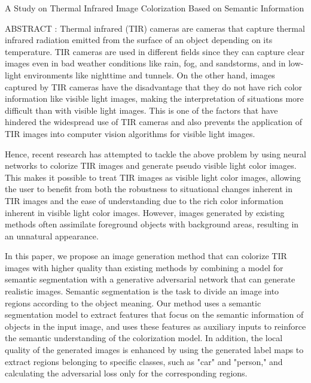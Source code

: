 \thispagestyle{empty}
\begin{center}
    A Study on Thermal Infrared Image Colorization Based on Semantic Information
\end{center}

\thispagestyle{empty}
\noindent ABSTRACT : Thermal infrared (TIR) cameras are cameras that capture thermal infrared radiation emitted from the surface of an object depending on its temperature. 
TIR cameras are used in different fields since they can capture clear images even in bad weather conditions like rain, fog, and sandstorms, and in low-light environments like nighttime and tunnels.
On the other hand, images captured by TIR cameras have the disadvantage that they do not have rich color information like visible light images, making the interpretation of situations more difficult than with visible light images. This is one of the factors that have hindered the widespread use of TIR cameras and also prevents the application of TIR images into computer vision algorithms for visible light images.

Hence, recent research has attempted to tackle the above problem by using neural networks to colorize TIR images and generate pseudo visible light color images.
This makes it possible to treat TIR images as visible light color images, allowing the user to benefit from both the robustness to situational changes inherent in TIR images and the ease of understanding due to the rich color information inherent in visible light color images.
However, images generated by existing methods often assimilate foreground objects with background areas, resulting in an unnatural appearance.

In this paper, we propose an image generation method that can colorize TIR images with higher quality than existing methods by combining a model for semantic segmentation with a generative adversarial network that can generate realistic images. 
Semantic segmentation is the task to divide an image into regions according to the object meaning.
Our method uses a semantic segmentation model to extract features that focus on the semantic information of objects in the input image, and uses these features as auxiliary inputs to reinforce the semantic understanding of the colorization model.
In addition, the local quality of the generated images is enhanced by using the generated label maps to extract regions belonging to specific classes, such as "car" and "person," and calculating the adversarial loss only for the corresponding regions.

